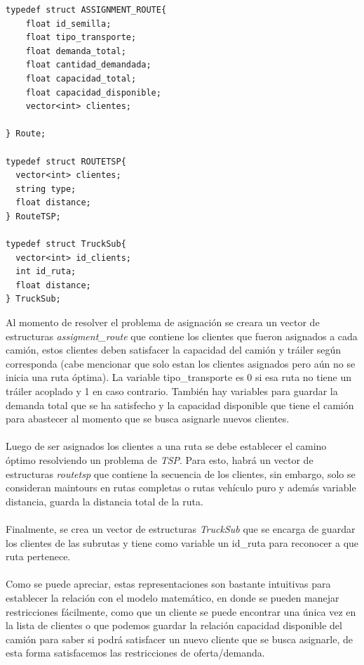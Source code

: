 \documentclass[letter, 10pt]{article}
\begin{document}
\begin{verbatim}
typedef struct ASSIGNMENT_ROUTE{   
    float id_semilla;
    float tipo_transporte;
    float demanda_total;
    float cantidad_demandada;
    float capacidad_total;
    float capacidad_disponible;
    vector<int> clientes;
    
} Route;

typedef struct ROUTETSP{
  vector<int> clientes;
  string type;
  float distance;
} RouteTSP;

typedef struct TruckSub{
  vector<int> id_clients;
  int id_ruta;
  float distance;
} TruckSub;
\end{verbatim}
Al momento de resolver el problema de asignación se creara un vector de estructuras \textit{assigment\_route} que contiene los clientes que fueron asignados a cada camión, estos clientes deben satisfacer la capacidad del camión y tráiler según corresponda (cabe mencionar que solo estan los clientes asignados pero aún no se inicia una ruta óptima). La variable tipo\_transporte es 0 si esa ruta no tiene un tráiler acoplado y 1 en caso contrario. También hay variables para guardar la demanda total que se ha satisfecho y la capacidad disponible que tiene el camión para abastecer al momento que se busca asignarle nuevos clientes.\\\\
Luego de ser asignados los clientes a una ruta se debe establecer el camino óptimo resolviendo un problema de \textit{TSP}. Para esto, habrá un vector de estructuras \textit{routetsp} que contiene la secuencia de los clientes, sin embargo, solo se consideran maintours en rutas completas o rutas vehículo puro y además variable distancia, guarda la distancia total de la ruta.
\\ \\
Finalmente, se crea un vector de estructuras \textit{TruckSub} que se encarga de guardar los clientes de las subrutas y tiene como variable un id\_ruta para reconocer a que ruta pertenece.\\\\
Como se puede apreciar, estas representaciones son bastante intuitivas para establecer la relación con el modelo matemático, en donde se pueden manejar restricciones fácilmente, como que un cliente se puede encontrar una única vez en la lista de clientes o que podemos guardar la relación capacidad disponible del camión para saber si podrá satisfacer un nuevo cliente que se busca asignarle, de esta forma satisfacemos las restricciones de oferta/demanda.
\end{document}
